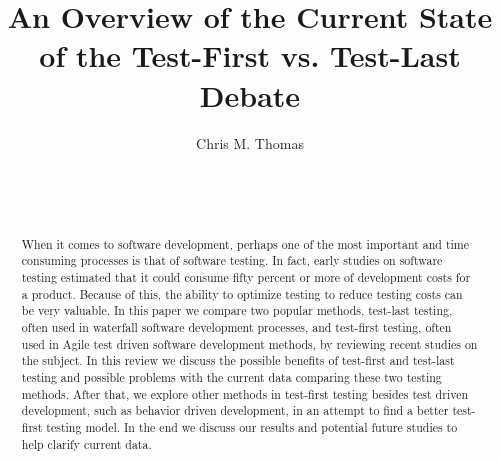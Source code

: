 \documentclass{sig-alternate}
\begin{document}

\title{An Overview of the Current State of the Test-First vs. Test-Last Debate}


\author{
\alignauthor
Chris M. Thomas\\
	\\
	\\
	\\
}
\maketitle
\begin{abstract}

When it comes to software development, perhaps one of the most important and time consuming processes is that of software testing. In fact, early studies on software testing estimated that it could consume fifty percent or more of development costs for a product.  Because of this, the ability to optimize testing to reduce testing costs can be very valuable.  In this paper  we compare two popular methods, test-last testing, often used in waterfall software development processes, and test-first testing, often used in Agile test driven software development methods, by reviewing recent studies on the subject.  In this review we discuss the possible benefits of test-first and test-last testing and possible problems with the current data comparing these two testing methods.  After that, we explore other methods in test-first testing besides test driven development, such as behavior driven development, in an attempt to find a better test-first testing model.  In the end we discuss our results and potential future studies to help clarify current data.
\end{abstract}


\end{document}
